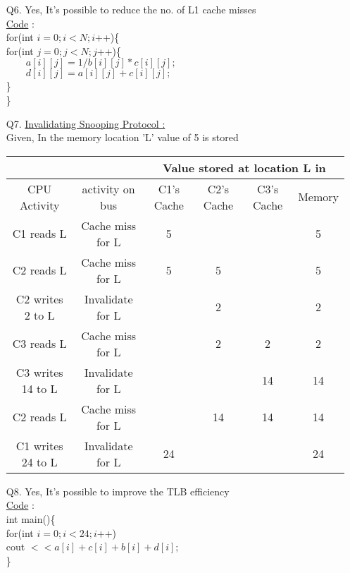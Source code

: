 \documentclass[letterpaper]{article}
\begin{document}
\begin{large}
\begin{flushleft}
\begin{enumerate}
\item[Q6. ]Yes, It's possible to reduce the no. of L1 cache misses\\[0.1in]
\underline{Code} :\\[0.1in]
for(int $i=0;i<N;i$++)\{\\[0.1in]
\quad for(int $j=0;j<N;j$++)\{\\[0.1in]
$\qquad a[i][j]=1/b[i][j] * c[i][j];$\\[0.1in]
$\qquad d[i][j]=a[i][j]+c[i][j];$\\[0.1in]
\quad \}\\[0.1in]\}\\[0.2in]
\item[Q7. ]\underline{Invalidating Snooping Protocol : }\\[0.1in]
Given, In the memory location 'L' value of 5 is stored\\[0.1in]
\begin{table}[h]
\centering
\begin{tabular}{|c|c|c|c|c|c|}
\hline
& & \multicolumn{4}{c|}{Value stored at location L in}\\
\hline
CPU Activity & activity on bus & C1's Cache & C2's Cache & C3's Cache & Memory\\
\hline
C1 reads L & Cache miss for L & 5 & & & 5 \\
\hline
C2 reads L & Cache miss for L & 5 & 5 & & 5 \\
\hline
C2 writes 2 to L & Invalidate for L & & 2 & & 2 \\
\hline
C3 reads L & Cache miss for L & & 2 & 2 & 2 \\
\hline
C3 writes 14 to L & Invalidate for L & & & 14 & 14 \\
\hline
C2 reads L & Cache miss for L & & 14 & 14 & 14 \\
\hline
C1 writes 24 to L & Invalidate for L & 24 & & & 24 \\
\hline
\end{tabular}
\end{table}

\item[Q8. ]Yes, It's possible to improve the TLB efficiency\\[0.1in]
\underline{Code} :\\[0.1in]
int main()\{\\[0.1in]
for(int $i=0;i<24;i$++)\\[0.1in]
cout $<< a[i]+c[i]+b[i]+d[i];$\\[0.1in]
\}\\[0.2in]


\end{enumerate}
\end{flushleft}
\end{large}
\end{document}
